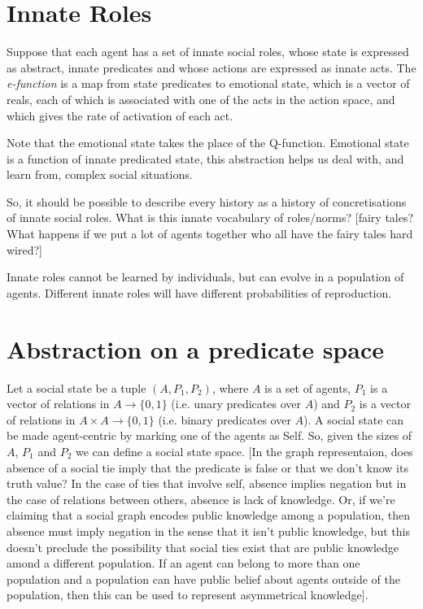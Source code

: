 \documentclass[a4paper]{article}
\begin{document}
\section{Innate Roles}

Suppose that each agent has a set of innate social roles, whose state is expressed as abstract, innate predicates and whose actions are expressed as innate acts. The \textit{e-function} is a map from state predicates to emotional state, which is a vector of reals, each of which is associated with one of the acts in the action space, and which gives the rate of activation of each act.

Note that the emotional state takes the place of the Q-function. Emotional state is a function of innate predicated state, this abstraction helps us deal with, and learn from, complex social situations.
 
So, it should be possible to describe every history as a history of concretisations of innate social roles. What is this innate vocabulary of roles/norms? [fairy tales? What happens if we put a lot of agents together who all have the fairy tales hard wired?]

Innate roles cannot be learned by individuals, but can evolve in a population of agents. Different innate roles will have different probabilities of reproduction.

\section{Abstraction on a predicate space}

Let a social state be a tuple $(A, P_1, P_2)$, where $A$ is a set of agents, $P_1$ is a vector of relations in $A \to \{0,1\}$ (i.e. unary predicates over $A$) and $P_2$ is a vector of relations in $A \times A \to \{0,1\}$ (i.e. binary predicates over $A$). A social state can be made agent-centric by marking one of the agents as Self. So, given the sizes of $A$, $P_1$ and $P_2$ we can define a social state space. [In the graph representaion, does absence of a social tie imply that the predicate is false or that we don't know its truth value? In the case of ties that involve self, absence implies negation but in the case of relations between others, absence is lack of knowledge. Or, if we're claiming that a social graph encodes public knowledge among a population, then absence must imply negation in the sense that it isn't public knowledge, but this doesn't preclude the possibility that social ties exist that are public knowledge amond a different population. If an agent can belong to more than one population and a population can have public belief about agents outside of the population, then this can be used to represent asymmetrical knowledge].
\end{document}
